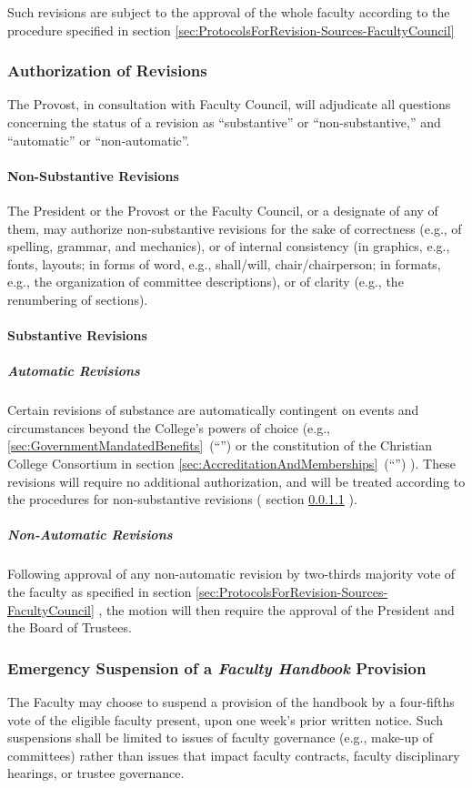 				Such revisions are subject to the approval of the whole faculty according to the procedure specified in
				section
				\ref{sec:ProtocolsForRevision-Sources-FacultyCouncil}
		\subsubsection{Authorization of Revisions}
			The Provost, in consultation with Faculty Council, will adjudicate all questions concerning the status of a revision as ``substantive'' or ``non-substantive,'' and ``automatic'' or ``non-automatic''.
			\paragraph{Non-Substantive Revisions}
				\label{sec:NonSubstantiveRevisions}
				The President or the Provost or the Faculty Council, or a designate of any of them, may authorize non-substantive revisions for the sake of correctness (e.g., of spelling, grammar, and mechanics), or of internal consistency (in graphics, e.g., fonts, layouts; in forms of word, e.g., shall/will, chair/chairperson; in formats, e.g., the organization of committee descriptions), or of clarity (e.g., the renumbering of sections).
			\paragraph{Substantive Revisions}
				\subparagraph{Automatic Revisions}
					Certain revisions of substance are automatically contingent on events and circumstances beyond the College's powers of choice (e.g.,
					\ref{sec:GovernmentMandatedBenefits}~(``'')
					or the constitution of the Christian College Consortium in
					section
					\ref{sec:AccreditationAndMemberships}~(``'')
					). These revisions will require no additional authorization, and will be treated according to the procedures for non-substantive revisions (
					section
					\ref{sec:NonSubstantiveRevisions}
					).
				\subparagraph{Non-Automatic Revisions}
					Following approval of any non-automatic revision by two-thirds majority vote of the faculty as specified in section
					\ref{sec:ProtocolsForRevision-Sources-FacultyCouncil}
					, the motion will then require the approval of the President and the Board of Trustees.
		\subsubsection{Emergency Suspension of a \emph{Faculty Handbook} Provision}
			\label{sec:EmergencySuspension}
			The Faculty may choose to suspend a provision of the handbook by a four-fifths vote of the eligible faculty present, upon one week's prior written notice.  Such suspensions shall be limited to issues of faculty governance (e.g., make-up of committees) rather than issues that impact faculty contracts, faculty disciplinary hearings, or trustee governance.
